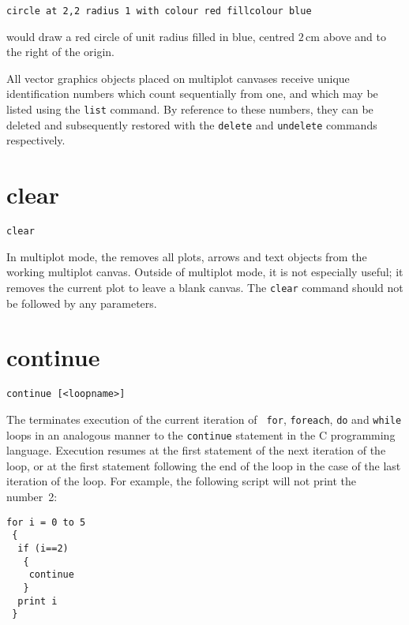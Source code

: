 \begin{verbatim}
circle at 2,2 radius 1 with colour red fillcolour blue
\end{verbatim}

\noindent would draw a red circle of unit radius filled in blue, centred
$2\,\mathrm{cm}$ above and to the right of the origin.

All vector graphics objects placed on multiplot canvases receive unique
identification numbers which count sequentially from one, and which may be
listed using the {\tt list} command.  By reference to these numbers, they can
be deleted and subsequently restored with the {\tt delete} and {\tt undelete}
commands respectively.


\section{clear}

\begin{verbatim}
clear
\end{verbatim}

In multiplot mode, the  removes all plots, arrows and text
objects from the working multiplot canvas. Outside of multiplot mode, it is not
especially useful; it removes the current plot to leave a blank canvas.  The
{\tt clear} command should not be followed by any parameters.


\section{continue}

\begin{verbatim}
continue [<loopname>]
\end{verbatim}

The  terminates execution of the current iteration of {\tt
for}, {\tt foreach}, {\tt do} and {\tt while} loops in an analogous manner to
the {\tt continue} statement in the C programming language. Execution resumes
at the first statement of the next iteration of the loop, or at the first
statement following the end of the loop in the case of the last iteration of
the loop.  For example, the following script will not print the number~2:

\begin{verbatim}
for i = 0 to 5
 {
  if (i==2)
   {
    continue
   }
  print i
 }
\end{verbatim}

